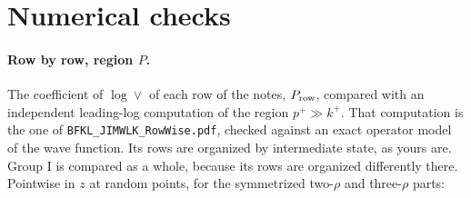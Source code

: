 \documentclass[10pt]{article}
\numberwithin{equation}{section}
\newcommand{\kp}{k^+}
\newcommand{\pp}{p^+}
\begin{document}
\section{Numerical checks}\label{sec:checks}
\paragraph{Row by row, region $P$.} The coefficient of $\log\vee$ of each row of the notes, $P_{\rm row}$, compared with an independent leading-log computation of the region $\pp\gg\kp$. That computation is the one of \texttt{BFKL\_JIMWLK\_RowWise.pdf}, checked against an exact operator model of the wave function. Its rows are organized by intermediate state, as yours are. Group I is compared as a whole, because its rows are organized differently there. Pointwise in $z$ at random points, for the symmetrized two-$\rho$ and three-$\rho$ parts:
\end{document}
